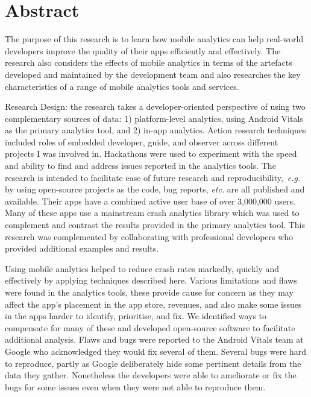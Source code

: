\chapter*{Abstract}

The purpose of this research is to learn how mobile analytics can help
real-world developers improve the quality of their apps efficiently and effectively. The research also considers the effects of mobile analytics in terms of the artefacts developed and maintained by the development team and also researches the key characteristics of a range of mobile analytics tools and services. %

Research Design: the research takes a developer-oriented perspective of using two complementary sources of data: 1) platform-level analytics, using Android Vitals as the primary analytics tool, and 2) in-app analytics.
%
Action research techniques included roles of embedded developer, guide, and observer across different projects I was involved in. Hackathons were used to experiment with the speed and ability to find and address issues reported in the analytics tools. 
%
The research is intended to facilitate ease of future research and reproducibility,~\emph{e.g.} by using  open-source projects as the code, bug reports, \emph{etc.} are all published and available. Their apps have a combined active user base of over 3,000,000 users. Many of these apps use a mainstream crash analytics library which was used to complement and contrast the results provided in the primary analytics tool.
%
This research was complemented by collaborating with professional developers who provided additional examples and results.

Using mobile analytics helped to reduce crash rates markedly, quickly and effectively by applying techniques described here.
Various limitations and flaws were found in the analytics tools, these provide cause for concern as they may affect the app's placement in the app store, revenues, and also make some issues in the apps harder to identify, prioritise, and fix. We identified ways to compensate for many of these and developed open-source software to facilitate additional analysis. Flaws and bugs were reported to the Android Vitals team at Google who acknowledged they would fix several of them.
%
Several bugs were hard to reproduce, partly as Google deliberately hide some pertinent details from the data they gather. Nonetheless the developers were able to ameliorate or fix the bugs for some issues even when they were not able to reproduce them. 

